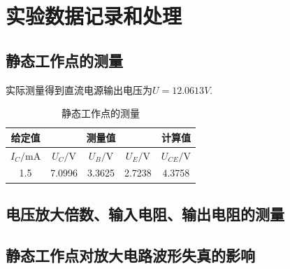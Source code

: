 ﻿\documentclass[10.5pt]{config}
\begin{document}
\section{实验数据记录和处理}


\subsection{静态工作点的测量}

实际测量得到直流电源输出电压为$U = 12.0613V$.

\begin{table}[H]
    \centering
    \caption{静态工作点的测量}
    \label{tab:static_point}
    \begin{tabular}{|c|c|c|c|c|}
        \hline
        给定值 & \multicolumn{3}{c|}{测量值} & 计算值 \\ \hline
        $I_C / \mathrm{mA}$ & $U_C / \mathrm{V}$ & $U_B / \mathrm{V}$ & $U_E / \mathrm{V}$ & $U_{CE} / \mathrm{V}$ \\ \hline
        1.5 & 7.0996 & 3.3625 & 2.7238 & 4.3758 \\ \hline
    \end{tabular}
\end{table}

\subsection{电压放大倍数、输入电阻、输出电阻的测量}

\begin{table}[H]
    \centering
    \caption{电压放大倍数、输入电阻、输出电阻的测量}
    \label{tab:dynamic_params}
\end{table}

\subsection{静态工作点对放大电路波形失真的影响}
\end{document}
